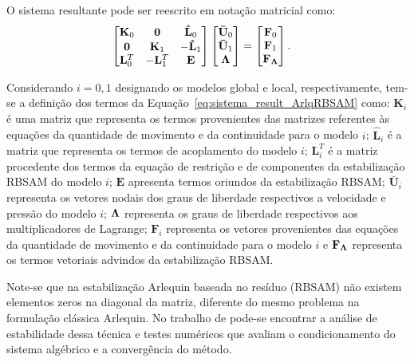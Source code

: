 O sistema resultante pode ser reescrito em notação matricial como:
\begin{align}
	\begin{bmatrix}
		\mathbf{K}_{0} & \mathbf{0} & \mathbf{\hat{L}}_{0} \\
		\mathbf{0} & \mathbf{K}_{1} & - \mathbf{\hat{L}}_{1} \\
		\mathbf{L}_{0}^{T} & -\mathbf{L}_{1}^{T} & \mathbf{E}
	\end{bmatrix}
	\begin{bmatrix}
		\mathbf{\bar{U}}_{0} \\
		\mathbf{\bar{U}}_{1} \\
		\boldsymbol{\Lambda}
	\end{bmatrix}
	&=
	\begin{bmatrix}
		\mathbf{F}_0 \\
		\mathbf{F}_1 \\
		\mathbf{F}_{\boldsymbol{\Lambda}}
	\end{bmatrix}.
	\label{eq:sistema_result_ArlqRBSAM}
\end{align}	

Considerando $i=0,1$ designando os modelos global e local, respectivamente, tem-se a definição dos termos da Equação~\eqref{eq:sistema_result_ArlqRBSAM} como: $\mathbf{K}_{i}$ é uma matriz que representa os termos provenientes das matrizes referentes às equações da quantidade de movimento e da continuidade para o modelo $i$; $\mathbf{\hat{L}}_{i}$ é a matriz que representa os termos de acoplamento do modelo $i$; $\mathbf{L}_{i}^{T}$ é a matriz procedente dos termos da equação de restrição e de componentes da estabilização RBSAM do modelo $i$; $\mathbf{E}$ apresenta termos oriundos da estabilização RBSAM; $\mathbf{\bar{U}}_{i}$ representa os vetores nodais dos graus de liberdade respectivos a velocidade e pressão do modelo $i$; $\boldsymbol{\Lambda}$ representa os graus de liberdade respectivos aos multiplicadores de Lagrange; $\mathbf{F}_i$ representa os vetores provenientes das equações da quantidade de movimento e da continuidade para o modelo $i$ e $\mathbf{F}_{\boldsymbol{\Lambda}}$ representa os termos vetoriais advindos da estabilização RBSAM. 

Note-se que na estabilização Arlequin baseada no resíduo (RBSAM) não existem elementos zeros na diagonal da matriz, diferente do mesmo problema na formulação clássica Arlequin. No trabalho de  pode-se encontrar a análise de estabilidade dessa técnica e testes numéricos que avaliam o condicionamento do sistema algébrico e a convergência do método.

